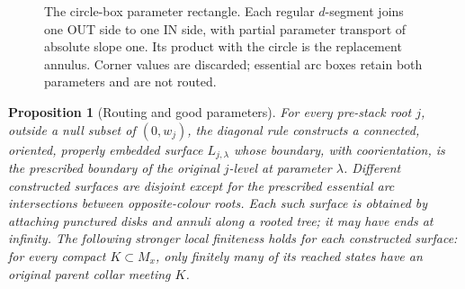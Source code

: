 \documentclass[11pt]{article}
\numberwithin{equation}{section}
\newtheorem{proposition}[theorem]{Proposition}
\theoremstyle{definition}
\theoremstyle{remark}
\begin{document}
\begin{figure}[htbp]
\centering
{}
\caption{The circle-box parameter rectangle.  Each regular $d$-segment
joins one OUT side to one IN side, with partial parameter transport of
absolute slope one.  Its product with the circle is the replacement
annulus.  Corner values are discarded; essential arc boxes retain both
parameters and are not routed.}
\label{wl:routing-figure}
\end{figure}


\begin{proposition}[Routing and good parameters]
\label{wl:routing}
For every pre-stack root $j$, outside a null subset of $(0,w_j)$, the diagonal
rule constructs a connected, oriented, properly embedded surface
$L_{j,\lambda}$ whose boundary, with coorientation, is the prescribed boundary
of the original $j$-level at parameter $\lambda$.  Different constructed
surfaces are disjoint except for the prescribed essential arc intersections
between opposite-colour roots.  Each such surface is obtained by attaching
punctured disks and annuli along a rooted tree; it may have ends at infinity.
The following stronger local finiteness holds for each constructed surface:
for every compact $K\subset M_x$, only finitely many of its reached states
have an original parent collar meeting $K$.
\end{proposition}
\end{document}
